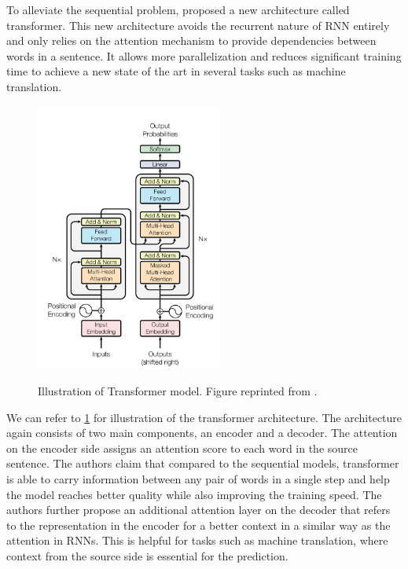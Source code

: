 To alleviate the sequential problem,  proposed a new architecture called transformer. This new architecture avoids the recurrent nature of RNN entirely and only relies on the attention mechanism to provide dependencies between words in a sentence. It allows more parallelization and reduces significant training time to achieve a new state of the art in several tasks such as machine translation.

\begin{figure}[t]
    {\includegraphics[width=0.55\textwidth]{img/transformer.png}}
    \centering
    \caption{Illustration of Transformer model. Figure reprinted from .}
    \label{img:transformer}
\end{figure}

We can refer to \cref{img:transformer} for illustration of the transformer architecture. The architecture again consists of two main components, an encoder and a decoder. The attention on the encoder side assigns an attention score to each word in the source sentence. The authors claim that compared to the sequential models, transformer is able to carry information between any pair of words in a single step and help the model reaches better quality while also improving the training speed. The authors further propose an additional attention layer on the decoder that refers to the representation in the encoder for a better context in a similar way as the attention in RNNs. This is helpful for tasks such as machine translation, where context from the source side is essential for the prediction.

